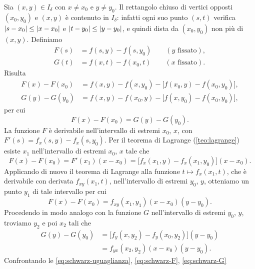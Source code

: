 \begin{dimostrazione}
Sia $(x,y)\in I_{\delta}$ con $x\neq x_{0}$ e $y\neq y_{0}$. Il rettangolo chiuso di vertici
opposti $(x_{0},y_{0})$ e $(x,y)$ è contenuto in $I_{\delta}$: infatti ogni suo punto
$(s,t)$ verifica $\lvert s-x_{0}\rvert\le\lvert x-x_{0}\rvert$ e $\lvert t-y_{0}\rvert\le\lvert y-y_{0}\rvert$, e quindi
dista da $(x_{0},y_{0})$ non più di $(x,y)$. Definiamo
\begin{equation}\label{eq:schwarz-FG}
\begin{aligned}
  F(s)&=f(s,y)-f(s,y_{0}) \qquad (y \text{ fissato}),\\
  G(t)&=f(x,t)-f(x_{0},t) \qquad (x \text{ fissato}).
\end{aligned}
\end{equation}
Risulta
\[
\begin{aligned}
  F(x)-F(x_{0})&=f(x,y)-f(x,y_{0})-\bigl[f(x_{0},y)-f(x_{0},y_{0})\bigr],\\
  G(y)-G(y_{0})&=f(x,y)-f(x_{0},y)-\bigl[f(x,y_{0})-f(x_{0},y_{0})\bigr],
\end{aligned}
\]
per cui
\begin{equation}\label{eq:schwarz-uguaglianza}
  F(x)-F(x_{0})=G(y)-G(y_{0}) .
\end{equation}
La funzione $F$ è derivabile nell'intervallo di estremi $x_{0}$, $x$, con
$F'(s)=f_{x}(s,y)-f_{x}(s,y_{0})$. Per il teorema di Lagrange (\cref{teo:lagrange}) esiste
$x_{1}$ nell'intervallo di estremi $x_{0}$, $x$ tale che
\[
  F(x)-F(x_{0})=F'(x_{1})(x-x_{0})=\bigl[f_{x}(x_{1},y)-f_{x}(x_{1},y_{0})\bigr](x-x_{0}).
\]
Applicando di nuovo il teorema di Lagrange alla funzione $t\mapsto f_{x}(x_{1},t)$, che
è derivabile con derivata $f_{xy}(x_{1},t)$, nell'intervallo di estremi $y_{0}$, $y$,
otteniamo un punto $y_{1}$ di tale intervallo per cui
\begin{equation}\label{eq:schwarz-F}
  F(x)-F(x_{0})=f_{xy}(x_{1},y_{1})(x-x_{0})(y-y_{0}) .
\end{equation}
Procedendo in modo analogo con la funzione $G$ nell'intervallo di estremi $y_{0}$, $y$,
troviamo $y_{2}$ e poi $x_{2}$ tali che
\begin{equation}\label{eq:schwarz-G}
\begin{split}
  G(y)-G(y_{0})&=\bigl[f_{y}(x,y_{2})-f_{y}(x_{0},y_{2})\bigr](y-y_{0})\\
  &=f_{yx}(x_{2},y_{2})(x-x_{0})(y-y_{0}).
\end{split}
\end{equation}
Confrontando le \eqref{eq:schwarz-uguaglianza}, \eqref{eq:schwarz-F}, \eqref{eq:schwarz-G}

\end{dimostrazione}
